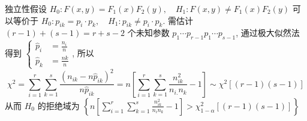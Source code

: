 \documentclass[10pt]{yerbaformat}
\begin{document}
\par 独立性假设 $H_{0}: F(x, y)=F_{1}(x) F_{2}(y), \quad H_{1}: F(x, y) \neq F_{1}(x) F_{2}(y)$ 可以等价于 $H_{0}: p_{i k}=p_{i} \cdot p_{k}, \quad H_{1}: p_{i k} \neq p_{i} \cdot p_{k}$. 需估计 $(r-1)+(s-1)=r+s-2$ 个未知参数 $p_{1} \cdots p_{r-1} p_{1} \cdots p_{s-1}$, 通过极大似然法得到 $\left\{\begin{aligned} \hat{p}_{i} &=\frac{n_{i}}{n} \\ \hat{p}_{k} &=\frac{n k}{n} \end{aligned}\right.$, 所以 $$\chi^{2}=\sum_{i=1}^{r} \sum_{k=1}^{s} \frac{\left(n_{i k}-n \hat{p}_{i k}\right)^{2}}{n \hat{p}_{i k}}=n\left[\sum_{i=1}^{r} \sum_{k=1}^{s} \frac{n_{i k}^{2}}{n_{i .} n_{k}}-1\right] \sim \chi^{2}[(r-1)(s-1)] $$ 从而 $H_{0}$ 的拒绝域为 $\left\{n\left[\sum_{i=1}^{r} \sum_{k=1}^{s} \frac{n_{i k}^{2}}{n_{i} n_{k}}-1\right]>\chi_{1-\alpha}^{2}[(r-1)(s-1)]\right\}$
\end{document}
